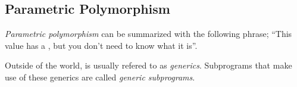 \subsection{Parametric Polymorphism}\label{subsec:Parametric_Polymorphism}
\begin{definition}\label{def:Parametric_Polymorphism}
  \emph{Parametric polymorphism} can be summarized with the following phrase; ``This value has a , but you don't need to know what it is''.

  \begin{remark}[Generics]\label{rmk:Generics}
    Outside of the  world,  is usually refered to as \emph{generics}.
    Subprograms that make use of these generics are called \emph{generic subprograms}.
  \end{remark}
\end{definition}


